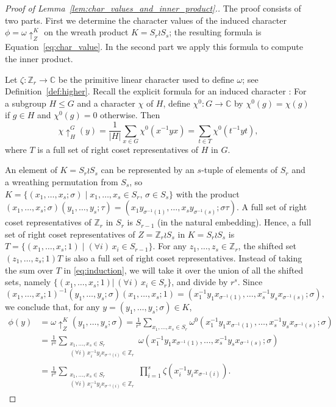 \documentclass[ALCO,published]{cedram}
\def\ZZ{{\mathbb Z}}
\begin{document}
\begin{proof}[Proof of  Lemma~\ref{lem:char_values_and_inner_product}.]
    The proof consists of two parts. 
    First we determine the character values of the induced character $\phi = \omega\uparrow_Z^K$ on the wreath product $K=S_r\wr S_{s}$; the resulting formula is Equation~\eqref{eq:char_value}. In the second part we 
    apply this formula to compute the inner product.
		
    Let $\zeta: \ZZ_r \to \mathbb{C}$ be the primitive linear character used to define $\omega$; see Definition~\ref{def:higher}. 
    Recall the explicit formula for an induced character \cite[(5.1)]{Isaacs}: 
    For a subgroup $H\leq G$ and a character $\chi$ of $H$, define $\chi^0 : G \to \mathbb{C}$ by $\chi^0(g) = \chi(g)$ if $g\in H$ and $\chi^0(g) = 0$ otherwise. Then
    \begin{equation}\label{eq:induction}
        \chi\uparrow_H^G(y)
        = \frac{1}{|H|} \sum_{x\in G} \chi^0(x^{-1}yx)
        = \sum_{t\in T} \chi^0(t^{-1}yt),
    \end{equation}
    where $T$ is a full set of right coset representatives of $H$ in $G$.
		
    An element of $K=S_r\wr S_s$ can be represented by an $s$-tuple of elements of $S_r$ and a wreathing permutation from $S_s$, so
    $K=\{(x_1,\ldots,x_s;\sigma) \mid x_1,\ldots,x_s \in S_{r},\,\sigma\in S_s\}$
    with the product
    $(x_1,\ldots,x_s;\sigma)(y_1,\ldots,y_s;\tau) = (x_1y_{\sigma^{-1}(1)},\ldots,x_sy_{\sigma^{-1}(s)};\sigma\tau)$. 
    A full set of right coset representatives of $\ZZ_r$ in $S_r$ is $S_{r-1}$ (in the natural embedding).
    Hence, a full set of right coset representatives of 
    $Z = \ZZ_r \wr S_s$ in $K= S_r \wr S_s$ is 
    $T = \{(x_1,\ldots,x_s;1)\mid (\forall i)\, x_i \in S_{r-1}\}$. For any $z_1,\ldots,z_s\in \ZZ_r$, the shifted set $(z_1,\ldots,z_s;1)T$ is also a full set of right coset representatives. 
    Instead of taking the sum over $T$ in \eqref{eq:induction}, we will take it over the union of all the shifted sets, namely $\{(x_1,\ldots,x_s;1) \vert\, (\forall i)\, x_i \in S_r\}$, and divide by $r^s$. 
    Since
    \[
        (x_1,\ldots,x_s;1)^{-1} (y_1,\ldots,y_s;\sigma) (x_1,\ldots,x_s;1)
        = (x_1^{-1}y_1x_{\sigma^{-1}(1)},\ldots,x_s^{-1}y_sx_{\sigma^{-1}(s)};\sigma),
    \]
    we conclude that, 
    for any $y = (y_1,\ldots,y_s;\sigma) \in K$,
    \begin{align*}
        \phi(y) 
        &= \omega\uparrow_Z^K(y_1,\ldots,y_s;\sigma)
        = \frac{1}{r^s} \sum_{x_1,\ldots,x_s \in S_r} \omega^0(x_1^{-1}y_1x_{\sigma^{-1}(1)},\ldots,x_s^{-1}y_sx_{\sigma^{-1}(s)};\sigma) \\ 
        &= \frac{1}{r^s} \sum_{\substack{x_1,\ldots,x_s \in S_r \\ (\forall i)\, x_i^{-1}y_ix_{\sigma^{-1}(i)} \in \ZZ_r}} \omega(x_1^{-1}y_1x_{\sigma^{-1}(1)},\ldots,x_s^{-1}y_sx_{\sigma^{-1}(s)};\sigma) \\
        &= \frac{1}{r^s} \sum_{\substack{x_1,\ldots,x_s \in S_r \\ (\forall i)\, x_i^{-1}y_ix_{\sigma^{-1}(i)} \in \ZZ_r}} \prod_{i=1}^{s} \zeta(x_i^{-1}y_ix_{\sigma^{-1}(i)}).
    \end{align*}


\end{proof}
\end{document}
